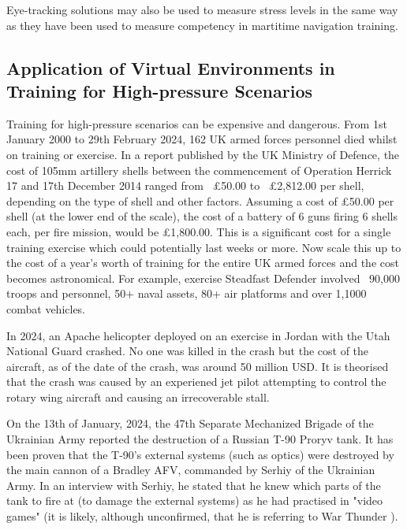 \documentclass[12pt]{article}
\begin{document}
Eye-tracking solutions may also be used to measure stress levels in the same way as they have been used to measure competency in martitime navigation training. \cite{atik2019use}

\subsection{Application of Virtual Environments in Training for High-pressure Scenarios} \label{sec:applicationsOfVirtualEnvironments}

Training for high-pressure scenarios can be expensive and dangerous. From 1st January 2000 to 29th February 2024, 162 UK armed forces personnel died whilst on training or exercise. \cite{ukmod2024} In a report published by the UK Ministry of Defence, the cost of 105mm artillery shells between the commencement of Operation Herrick 17 and 17th December 2014 ranged from ~£50.00 to ~£2,812.00 per shell, depending on the type of shell and other factors. \cite{ukmod2015} Assuming a cost of £50.00 per shell (at the lower end of the scale), the cost of a battery of 6 guns firing 6 shells each, per fire mission, would be £1,800.00. This is a significant cost for a single training exercise which could potentially last weeks or more. Now scale this up to the cost of a year's worth of training for the entire UK armed forces and the cost becomes astronomical. For example, exercise Steadfast Defender involved ~90,000 troops and personnel, 50+ naval assets, 80+ air platforms and over 1,1000 combat vehicles. \cite{steadfastdefender24}

In 2024, an Apache helicopter deployed on an exercise in Jordan with the Utah National Guard crashed. \cite{intergalactic2024} No one was killed in the crash but the cost of the aircraft, as of the date of the crash, was around 50 million USD. \cite{cbsaustin2024} It is theorised that the crash was caused by an experiened jet pilot attempting to control the rotary wing aircraft and causing an irrecoverable stall. \cite{carlisle2024}

On the 13th of January, 2024, the 47th Separate Mechanized Brigade of the Ukrainian Army reported the destruction of a Russian T-90 Proryv tank. \cite{malyasov2024} It has been proven that the T-90's external systems (such as optics) were destroyed by the main cannon of a Bradley AFV, commanded by Serhiy of the Ukrainian Army. In an interview with Serhiy, he stated that he knew which parts of the tank to fire at (to damage the external systems) as he had practised in "video games" \cite{militaryconflict2025} (it is likely, although unconfirmed, that he is referring to War Thunder \cite{warthunder}).
\end{document}
